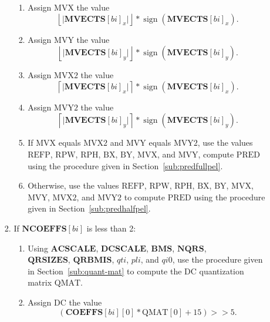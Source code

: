 \documentclass[9pt,letterpaper]{book}
\newcommand{\idx}[1]{{\ensuremath{\mathit{#1}}}}
\newcommand{\qti}{\idx{qti}}
\newcommand{\pli}{\idx{pli}}
\newcommand{\bi}{\idx{bi}}
\newcommand{\bitvar}[1]{\ensuremath{\mathbf{\bm{#1}}}}
\newcommand{\locvar}[1]{\ensuremath{\mathrm{#1}}}
\newcommand{\sign}{\ensuremath{\mathop{\mathrm{sign}}\nolimits}}
\numberwithin{equation}{chapter}
\numberwithin{figure}{chapter}
\numberwithin{table}{chapter}
\begin{document}
\begin{enumerate}
\begin{enumerate}
\begin{enumerate}
\begin{enumerate}
\item
Assign \locvar{MVX} the value
\begin{equation*}
 \left\lfloor\lvert\bitvar{MVECTS}[\locvar{\bi}]_x\rvert\right\rfloor*
 \sign(\bitvar{MVECTS}[\locvar{\bi}]_x).
\end{equation*}
\item
Assign \locvar{MVY} the value
\begin{equation*}
 \left\lfloor\lvert\bitvar{MVECTS}[\locvar{\bi}]_y\rvert\right\rfloor*
 \sign(\bitvar{MVECTS}[\locvar{\bi}]_y).
\end{equation*}
\item
Assign \locvar{MVX2} the value
\begin{equation*}
 \left\lceil\lvert\bitvar{MVECTS}[\locvar{\bi}]_x\rvert\right\rceil*
 \sign(\bitvar{MVECTS}[\locvar{\bi}]_x).
\end{equation*}
\item
Assign \locvar{MVY2} the value
\begin{equation*}
 \left\lceil\lvert\bitvar{MVECTS}[\locvar{\bi}]_y\rvert\right\rceil*
 \sign(\bitvar{MVECTS}[\locvar{\bi}]_y).
\end{equation*}
\item
If \locvar{MVX} equals \locvar{MVX2} and \locvar{MVY} equals \locvar{MVY2},
 use the values \locvar{REFP}, \locvar{RPW}, \locvar{RPH}, \locvar{BX},
 \locvar{BY}, \locvar{MVX}, and \locvar{MVY}, compute \locvar{PRED} using the
 procedure given in Section~\ref{sub:predfullpel}.
\item
Otherwise, use the values \locvar{REFP}, \locvar{RPW}, \locvar{RPH},
 \locvar{BX}, \locvar{BY}, \locvar{MVX}, \locvar{MVY}, \locvar{MVX2}, and
 \locvar{MVY2} to compute \locvar{PRED} using the procedure given in
 Section~\ref{sub:predhalfpel}.
\end{enumerate}
\item
\label{step:dc-only-idct}
If $\bitvar{NCOEFFS}[\locvar{\bi}]$ is less than 2:
\begin{enumerate}
\item
Using \bitvar{ACSCALE}, \bitvar{DCSCALE}, \bitvar{BMS}, \bitvar{NQRS}, \\
 \bitvar{QRSIZES}, \bitvar{QRBMIS}, \locvar{\qti}, \locvar{\pli}, and
 \locvar{\idx{qi0}}, use the procedure given in Section~\ref{sub:quant-mat} to
 compute the DC quantization matrix \locvar{QMAT}.
\item
Assign \locvar{DC} the value
\begin{equation*}
 (\bitvar{COEFFS}[\bitvar{\bi}][0]*\locvar{QMAT}[0]+15)>>5.

\end{equation*}
\end{enumerate}
\end{enumerate}
\end{enumerate}
\end{enumerate}
\end{document}
